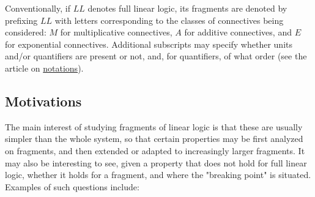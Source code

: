 Conventionally, if \(LL\) denotes full linear logic, its fragments are
denoted by prefixing \(LL\) with letters corresponding to the classes of
connectives being considered: \(M\) for multiplicative connectives,
\(A\) for additive connectives, and \(E\) for exponential connectives.
Additional subscripts may specify whether units and/or quantifiers are
present or not, and, for quantifiers, of what order (see the article on
\url{notations}).

\subsection{Motivations}\label{motivations}

The main interest of studying fragments of linear logic is that these
are usually simpler than the whole system, so that certain properties
may be first analyzed on fragments, and then extended or adapted to
increasingly larger fragments. It may also be interesting to see, given
a property that does not hold for full linear logic, whether it holds
for a fragment, and where the "breaking point" is situated. Examples of
such questions include:


